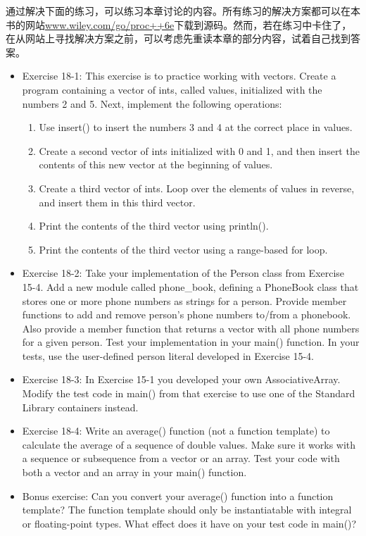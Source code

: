 通过解决下面的练习，可以练习本章讨论的内容。所有练习的解决方案都可以在本书的网站\url{www.wiley.com/go/proc++6e}下载到源码。然而，若在练习中卡住了，在从网站上寻找解决方案之前，可以考虑先重读本章的部分内容，试着自己找到答案。

\begin{itemize}
\item
Exercise 18-1: This exercise is to practice working with vectors. Create a program containing a vector of ints, called values, initialized with the numbers 2 and 5. Next, implement the following operations:
\begin{enumerate}
\item
Use insert() to insert the numbers 3 and 4 at the correct place in values.

\item
Create a second vector of ints initialized with 0 and 1, and then insert the contents of this new vector at the beginning of values.

\item
Create a third vector of ints. Loop over the elements of values in reverse, and insert them in this third vector.

\item
Print the contents of the third vector using println().

\item
Print the contents of the third vector using a range-based for loop.
\end{enumerate}

\item
Exercise 18-2: Take your implementation of the Person class from Exercise 15-4. Add a new module called phone\_book, defining a PhoneBook class that stores one or more phone numbers as strings for a person. Provide member functions to add and remove person’s phone numbers to/from a phonebook. Also provide a member function that returns a vector with all phone numbers for a given person. Test your implementation in your main() function. In your tests, use the user-defined person literal developed in Exercise 15-4.

\item
Exercise 18-3: In Exercise 15-1 you developed your own AssociativeArray. Modify the test code in main() from that exercise to use one of the Standard Library containers instead.

\item
Exercise 18-4: Write an average() function (not a function template) to calculate the average of a sequence of double values. Make sure it works with a sequence or subsequence from a vector or an array. Test your code with both a vector and an array in your main() function.

\item
Bonus exercise: Can you convert your average() function into a function template? The function template should only be instantiatable with integral or floating-point types. What effect does it have on your test code in main()?
\end{itemize}














